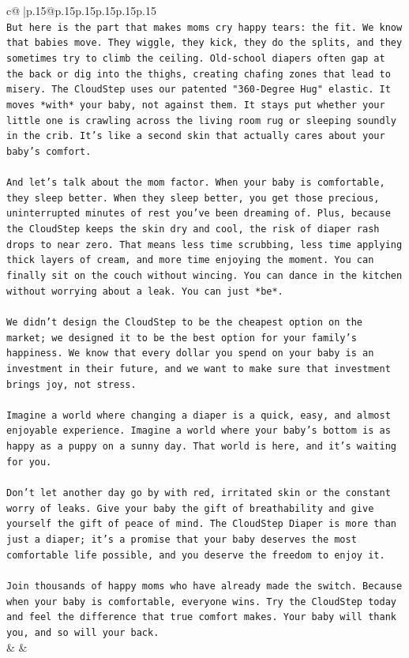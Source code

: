 \documentclass{article}
\begin{document}
{\begin{supertabular}{c@{$\;$}|p{.15\linewidth}@{}p{.15\linewidth}p{.15\linewidth}p{.15\linewidth}p{.15\linewidth}p{.15\linewidth}}
{{{\\ 
\texttt{But here is the part that makes moms cry happy tears: the fit. We know that babies move. They wiggle, they kick, they do the splits, and they sometimes try to climb the ceiling. Old{-}school diapers often gap at the back or dig into the thighs, creating chafing zones that lead to misery. The CloudStep uses our patented "360{-}Degree Hug" elastic. It moves *with* your baby, not against them. It stays put whether your little one is crawling across the living room rug or sleeping soundly in the crib. It's like a second skin that actually cares about your baby's comfort.} \\
\\ 
\texttt{And let's talk about the mom factor. When your baby is comfortable, they sleep better. When they sleep better, you get those precious, uninterrupted minutes of rest you've been dreaming of. Plus, because the CloudStep keeps the skin dry and cool, the risk of diaper rash drops to near zero. That means less time scrubbing, less time applying thick layers of cream, and more time enjoying the moment. You can finally sit on the couch without wincing. You can dance in the kitchen without worrying about a leak. You can just *be*.} \\
\\ 
\texttt{We didn't design the CloudStep to be the cheapest option on the market; we designed it to be the best option for your family's happiness. We know that every dollar you spend on your baby is an investment in their future, and we want to make sure that investment brings joy, not stress.} \\
\\ 
\texttt{Imagine a world where changing a diaper is a quick, easy, and almost enjoyable experience. Imagine a world where your baby's bottom is as happy as a puppy on a sunny day. That world is here, and it's waiting for you.} \\
\\ 
\texttt{Don't let another day go by with red, irritated skin or the constant worry of leaks. Give your baby the gift of breathability and give yourself the gift of peace of mind. The CloudStep Diaper is more than just a diaper; it's a promise that your baby deserves the most comfortable life possible, and you deserve the freedom to enjoy it.} \\
\\ 
\texttt{Join thousands of happy moms who have already made the switch. Because when your baby is comfortable, everyone wins. Try the CloudStep today and feel the difference that true comfort makes. Your baby will thank you, and so will your back.} \\
            }
        }
    }
    & & \\ \\


\end{supertabular}}
\end{document}
